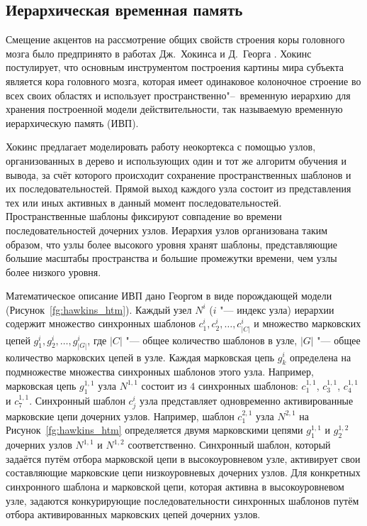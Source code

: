 \subsection{Иерархическая временная память}\label{subsect:htm}

Смещение акцентов на рассмотрение общих свойств строения коры головного мозга было предпринято в работах Дж.~Хокинса и Д.~Георга \cite{George2005,Hawkins2009}. Хокинс постулирует, что основным инструментом построения картины мира субъекта является кора головного мозга, которая имеет одинаковое колоночное строение во всех своих областях и использует пространственно"--~временную иерархию для хранения построенной модели действительности, так называемую временную иерархическую память (ИВП).

Хокинс предлагает моделировать работу неокортекса с помощью узлов, организованных в дерево и использующих один и тот же алгоритм обучения и вывода, за счёт которого происходит сохранение пространственных шаблонов и их последовательностей. Прямой выход каждого узла состоит из представления тех или иных активных в данный момент последовательностей. Пространственные шаблоны фиксируют совпадение во времени последовательностей дочерних узлов. Иерархия узлов организована таким образом, что узлы более высокого уровня хранят шаблоны, представляющие большие масштабы пространства и большие промежутки времени, чем узлы более низкого уровня.

Математическое описание ИВП дано Георгом в виде порождающей модели (Рисунок~\ref{fg:hawkins_htm}). Каждый узел $N^i$ ($i$ "--- индекс узла) иерархии содержит множество синхронных шаблонов $c_1^i, c_2^i,\dots,c_{|C|}^i$ и множество марковских цепей $g_1^i,g_2^i,\dots,g_{|G|}^i$, где $|C|$ "--- общее количество шаблонов в узле, $|G|$ "--- общее количество марковских цепей в узле. Каждая марковская цепь $g_k^i$ определена на подмножестве множества синхронных шаблонов этого узла. Например, марковская цепь $g_1^{1,1}$ узла $N^{1,1}$ состоит из $4$ синхронных шаблонов: $c_1^{1,1}$, $c_3^{1,1}$, $c_4^{1,1}$ и $c_7^{1,1}$. Синхронный шаблон $c_j^i$ узла представляет одновременно активированные марковские цепи дочерних узлов. Например, шаблон $c_1^{2,1}$ узла $N^{2,1}$ на Рисунок~\ref{fg:hawkins_htm} определяется двумя марковскими цепями $g_1^{1,1}$ и $g_2^{1,2}$ дочерних узлов $N^{1,1}$ и $N^{1,2}$ соответственно. Синхронный шаблон, который задаётся путём отбора марковской цепи в высокоуровневом узле, активирует свои составляющие марковские цепи низкоуровневых дочерних узлов. Для конкретных синхронного шаблона и марковской цепи, которая активна в высокоуровневом узле, задаются конкурирующие последовательности синхронных шаблонов путём отбора активированных марковских цепей дочерних узлов.

